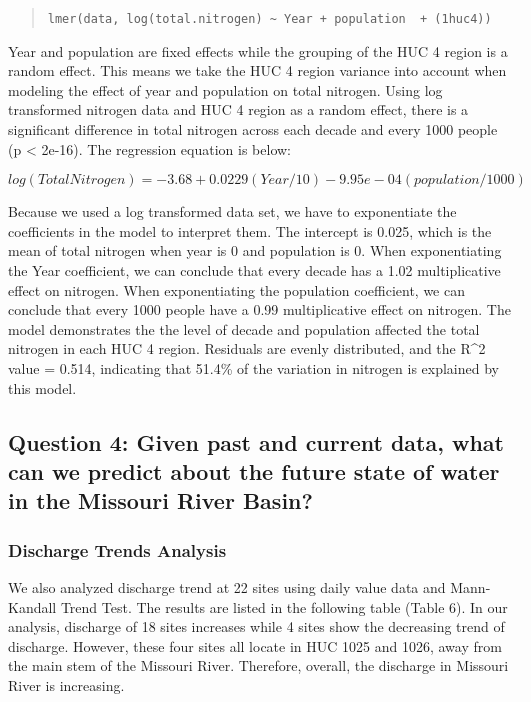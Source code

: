 \documentclass[12pt,]{article}
\begin{document}
\begin{quote}
\texttt{lmer(data,\ log(total.nitrogen)\ \textasciitilde{}\ Year\ +\ population\ \ +\ (1\textbar{}huc4))}
\end{quote}

Year and population are fixed effects while the grouping of the HUC 4
region is a random effect. This means we take the HUC 4 region variance
into account when modeling the effect of year and population on total
nitrogen. Using log transformed nitrogen data and HUC 4 region as a
random effect, there is a significant difference in total nitrogen
across each decade and every 1000 people (p \textless{} 2e-16). The
regression equation is below:

\[log(Total Nitrogen) = -3.68 + 0.0229(Year/10) - 9.95e-04(population/1000)\]

Because we used a log transformed data set, we have to exponentiate the
coefficients in the model to interpret them. The intercept is 0.025,
which is the mean of total nitrogen when year is 0 and population is 0.
When exponentiating the Year coefficient, we can conclude that every
decade has a 1.02 multiplicative effect on nitrogen. When exponentiating
the population coefficient, we can conclude that every 1000 people have
a 0.99 multiplicative effect on nitrogen. The model demonstrates the the
level of decade and population affected the total nitrogen in each HUC 4
region. Residuals are evenly distributed, and the R\^{}2 value = 0.514,
indicating that 51.4\% of the variation in nitrogen is explained by this
model.

\hypertarget{question-4-given-past-and-current-data-what-can-we-predict-about-the-future-state-of-water-in-the-missouri-river-basin}{%
\subsection{Question 4: Given past and current data, what can we predict
about the future state of water in the Missouri River
Basin?}\label{question-4-given-past-and-current-data-what-can-we-predict-about-the-future-state-of-water-in-the-missouri-river-basin}}

\hypertarget{discharge-trends-analysis}{%
\subsubsection{Discharge Trends
Analysis}\label{discharge-trends-analysis}}

We also analyzed discharge trend at 22 sites using daily value data and
Mann-Kandall Trend Test. The results are listed in the following table
(Table 6). In our analysis, discharge of 18 sites increases while 4
sites show the decreasing trend of discharge. However, these four sites
all locate in HUC 1025 and 1026, away from the main stem of the Missouri
River. Therefore, overall, the discharge in Missouri River is
increasing.
\end{document}
